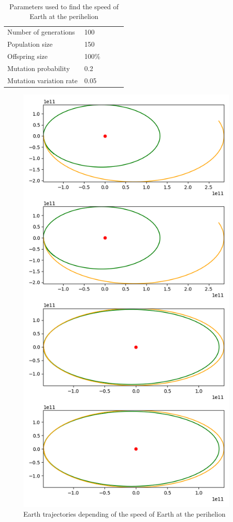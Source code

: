 \begin{table}[H]
    \begin{tabular}{lllll}
    Number of generations & 100 \\
    Population size & 150 \\
    Offspring size & 100\% \\
    Mutation probability & 0.2 \\
    Mutation variation rate & 0.05
    \end{tabular}
    \caption{Parameters used to find the speed of Earth at the perihelion}
    \label{speed_table}
\end{table}

\begin{figure}[H]
    \center
    \includegraphics[scale=.3]{img/earth_speed.png}
    \caption{Earth trajectories depending of the speed of Earth at the perihelion}
    \label{speed_2}
\end{figure}

